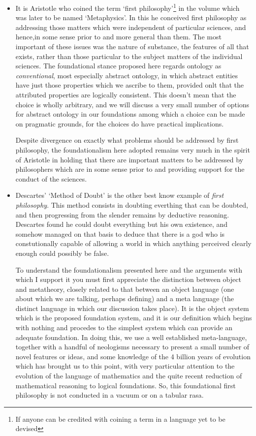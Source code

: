 \begin{itemize}
\item It is Aristotle who coined the term `first philosophy'\footnote{If anyone can be credited with coining a term in a language yet to be devised}%
 in the volume which was later to be named `Metaphysics'.
  In this he conceived first philosophy as addressing those matters which were independent of particular sciences, and hence,in some sense prior to and more general than them.
  The most important of these issues was the nature of substance, the features of all that exists, rather than those particular to the subject matters of the individual sciences.
  The foundational stance proposed here regards ontology as \emph{conventional}, most especially abstract ontology, in which abstract entities have just those properties which we ascribe to them, provided onlt that the attributed properties are logically consistent.
  This doesn't mean that the choice is wholly arbitrary, and we will discuss a very small number of options for abstract ontology in our foundations among which a choice can be made on pragmatic grounds, for the choices do have practical implications.

  Despite divergence on exactly what problems should be addressed by first philosophy, the foundationalism here adopted remains very much in the spirit of Aristotle in holding that there are important matters to be addressed by philosophers which are in some sense prior to and providing support for the conduct of the sciences.
  
\item Descartes' `Method of Doubt' is the other best know example of \emph{first philosophy}.
  This method consists in doubting everthing that can be doubted, and then progressing from the slender remains by deductive reasoning.
  Descartes found he could doubt everything but his own existence, and somehow managed on that basis to deduce that there is a god who is constutionally capable of allowing a world in which anything perceived clearly enough could possibly be false.

  To understand the foundationalism presented here and the arguments with which I support it you must first appreciate the distinction between object and metatheory, closely related to that between an object language (one about which we are talking, perhaps defining) and a meta language (the distinct language in which our discussion takes place).
  It is the object system which is the proposed foundation system, and it is our definition which begins with nothing and procedes to the simplest system which can provide an adequate foundation.
  In doing this, we use a well established meta-language, together with a handful of neologisms necessary to present a small number of novel features or ideas, and some knowledge of the 4 billion years of evolution which has brought us to this point, with very particular attention to the evolution of the language of mathematics and the quite recent reduction of mathematical reasoning to logical foundations.
  So, this foundational first philosophy is not conducted in a vacuum or on a tabular rasa.

\end{itemize}

